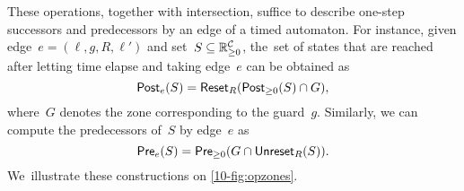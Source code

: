 These operations, together with intersection, suffice to describe
one-step successors and predecessors by an edge of a timed automaton.
For instance, given edge~$e=(\ell,g,R,\ell')$ and
set~$S \subseteq \mathbb{R}_{\geq 0}^{\mathcal{C}}$, the~set of states that are reached
after letting time elapse and taking edge~$e$ can be obtained as
\[
  \textrm{\sf Post}_e(S) = \mathsf{Reset}_R(\textrm{\sf Post}_{\geq 0}(S)\cap G),
\]
where~$G$ denotes the zone corresponding to the guard~$g$.
Similarly, we can compute the predecessors of~$S$ by edge~$e$ as
\[
\textrm{\sf Pre}_e(S) = \textrm{\sf Pre}_{\geq 0}(G \cap \textrm{\sf Unreset}_R(S)).
\]
We~illustrate these constructions on \cref{10-fig:opzones}.
